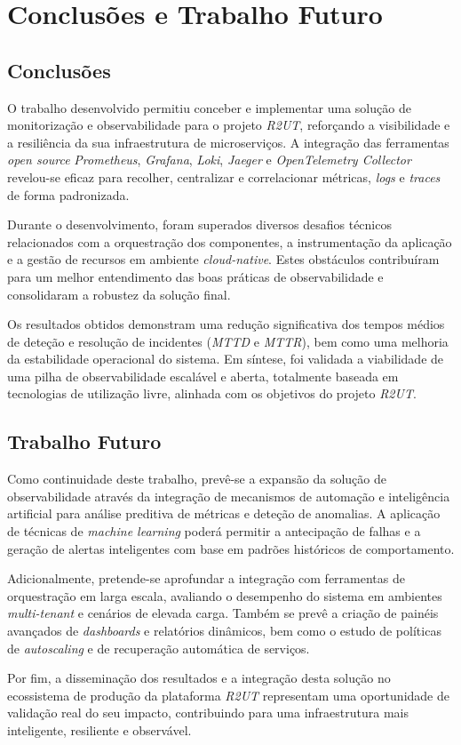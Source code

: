 \chapter{Conclusões e Trabalho Futuro}

\section{Conclusões}

O trabalho desenvolvido permitiu conceber e implementar uma solução de monitorização e observabilidade para o projeto \textit{R2UT}, reforçando a visibilidade e a resiliência da sua infraestrutura de microserviços. A integração das ferramentas \textit{open source} \textit{Prometheus}, \textit{Grafana}, \textit{Loki}, \textit{Jaeger} e \textit{OpenTelemetry Collector} revelou-se eficaz para recolher, centralizar e correlacionar métricas, \textit{logs} e \textit{traces} de forma padronizada.

Durante o desenvolvimento, foram superados diversos desafios técnicos relacionados com a orquestração dos componentes, a instrumentação da aplicação e a gestão de recursos em ambiente \textit{cloud-native}. Estes obstáculos contribuíram para um melhor entendimento das boas práticas de observabilidade e consolidaram a robustez da solução final.  

Os resultados obtidos demonstram uma redução significativa dos tempos médios de deteção e resolução de incidentes (\textit{MTTD} e \textit{MTTR}), bem como uma melhoria da estabilidade operacional do sistema. Em síntese, foi validada a viabilidade de uma pilha de observabilidade escalável e aberta, totalmente baseada em tecnologias de utilização livre, alinhada com os objetivos do projeto \textit{R2UT}.

\section{Trabalho Futuro}

Como continuidade deste trabalho, prevê-se a expansão da solução de observabilidade através da integração de mecanismos de automação e inteligência artificial para análise preditiva de métricas e deteção de anomalias. A aplicação de técnicas de \textit{machine learning} poderá permitir a antecipação de falhas e a geração de alertas inteligentes com base em padrões históricos de comportamento.

Adicionalmente, pretende-se aprofundar a integração com ferramentas de orquestração em larga escala, avaliando o desempenho do sistema em ambientes \textit{multi-tenant} e cenários de elevada carga. Também se prevê a criação de painéis avançados de \textit{dashboards} e relatórios dinâmicos, bem como o estudo de políticas de \textit{autoscaling} e de recuperação automática de serviços.

Por fim, a disseminação dos resultados e a integração desta solução no ecossistema de produção da plataforma \textit{R2UT} representam uma oportunidade de validação real do seu impacto, contribuindo para uma infraestrutura mais inteligente, resiliente e observável.
